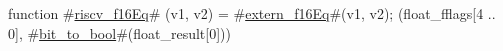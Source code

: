 function #\hyperref[sailRISCVzriscvzyf16Eq]{riscv\_f16Eq}# (v1, v2) = {
  #\hyperref[sailRISCVzexternzyf16Eq]{extern\_f16Eq}#(v1, v2);
  (float_fflags[4 .. 0], #\hyperref[sailRISCVzbitzytozybool]{bit\_to\_bool}#(float_result[0]))
}
